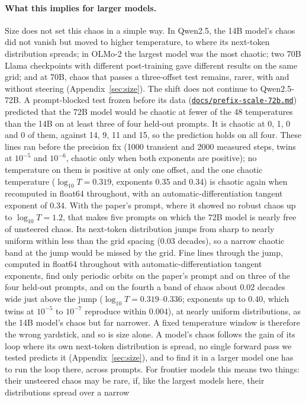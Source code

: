 \documentclass[11pt,letterpaper]{article}
\newcommand{\repourl}{https://github.com/tdj28/neural-shrimp}
\newcommand{\reporef}{arxiv-v1}
\newcommand{\repo}[1]{\href{\repourl/blob/\reporef/#1}{\nolinkurl{#1}}}
\begin{document}
\paragraph{What this implies for larger models.} Size does not set this chaos in a simple way. In Qwen2.5, the 14B
model's chaos did not vanish but moved to higher temperature, to where its next-token distribution spreads; in OLMo-2
the largest model was the most chaotic; two 70B Llama checkpoints with different post-training gave different results
on the same grid;
and at 70B, chaos that passes a three-offset test remains, rarer, with and without steering (Appendix~\ref{sec:size}). The shift does not
continue to Qwen2.5-72B. A prompt-blocked test frozen before its data (\repo{docs/prefix-scale-72b.md}) predicted
that the 72B model would be chaotic at fewer of the 48 temperatures than the 14B on at least three of four held-out
prompts. It is chaotic at 0, 1, 0 and 0 of them, against 14, 9, 11 and 15, so the prediction holds on all four. These
lines ran before the precision fix (1000 transient and 2000 measured steps, twins at $10^{-5}$ and $10^{-6}$, chaotic
only when both exponents are positive); no temperature on them is positive at only one offset, and the one chaotic
temperature ($\log_{10}T=0.319$, exponents 0.35 and 0.34) is chaotic again when recomputed in float64 throughout,
with an automatic-differentiation tangent exponent of 0.34. With the paper's prompt, where it showed no robust chaos up to
$\log_{10}T=1.2$, that makes five prompts on which the 72B model is nearly free of unsteered chaos. Its next-token distribution jumps from sharp to nearly uniform within less
than the grid spacing (0.03 decades), so a narrow chaotic band at the jump would be missed by the grid. Fine lines
through the jump, computed in float64 throughout with automatic-differentiation tangent exponents, find only periodic orbits on the
paper's prompt and on three of the four held-out prompts, and on the fourth a band of chaos about 0.02 decades wide
just above the jump ($\log_{10}T=0.319$--$0.336$; exponents up to 0.40, which twins at $10^{-5}$ to $10^{-7}$ reproduce
within 0.004), at nearly uniform distributions, as the 14B model's chaos but far narrower. A fixed temperature window is therefore the wrong yardstick, and so is size alone. A model's chaos follows the
gain of its loop where its own next-token distribution is spread, no single forward pass we tested predicts it (Appendix~\ref{sec:size}), and
to find it in a larger model one has to run the loop there, across prompts. For frontier models this means two
things: their unsteered chaos may be rare, if, like the largest models here, their distributions spread over a narrow
\end{document}
